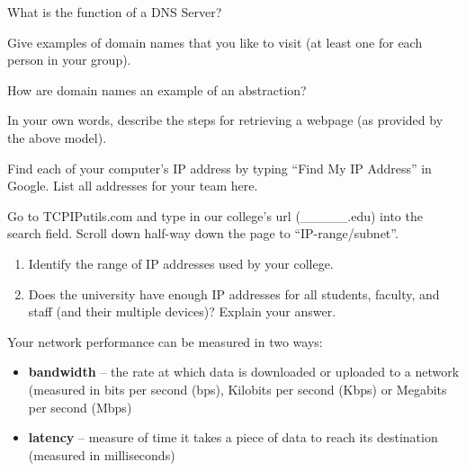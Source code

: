 \documentclass[12pt]{article}
\begin{document}
\Q What is the function of a DNS Server?

\begin{answer}
\end{answer}


\Q Give examples of domain names that you like to visit (at least one for each person in your group).

\begin{answer}
\end{answer}


\Q How are domain names an example of an abstraction?

\begin{answer}
\end{answer}


\Q In your own words, describe the steps for retrieving a webpage (as provided by the above model).

\begin{answer}
\end{answer}


\Q Find each of your computer's IP address by typing ``Find My IP Address'' in Google. List all addresses for your team here.

\begin{answer}
\end{answer}


\Q Go to TCPIPutils.com and type in our college's url (\_\_\_\_\_.edu) into the search field.
Scroll down half-way down the page to ``IP-range/subnet''.
\begin{enumerate}
\item Identify the range of IP addresses used by your college.
\item Does the university have enough IP addresses for all students, faculty, and staff (and their multiple devices)? Explain your answer.
\end{enumerate}



Your network performance can be measured in two ways:
\begin{itemize}
\item \textbf{bandwidth} -- the rate at which data is downloaded or uploaded to a network (measured in bits per second (bps), Kilobits per second (Kbps) or Megabits per second (Mbps)
\item \textbf{latency} -- measure of time it takes a piece of data to reach its destination (measured in milliseconds)
\end{itemize}
\end{document}
